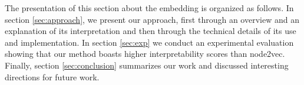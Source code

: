 The presentation of this section about the \parfaite embedding is organized as follows. In section \ref{sec:approach}, we present our approach, first through an overview and an explanation of its interpretation and then through the technical details of its use and implementation. 
In section \ref{sec:exp} we conduct an experimental evaluation showing that our method boasts higher interpretability scores than node2vec.
Finally, section \ref{sec:conclusion} summarizes our work and discussed interesting directions for future work.






